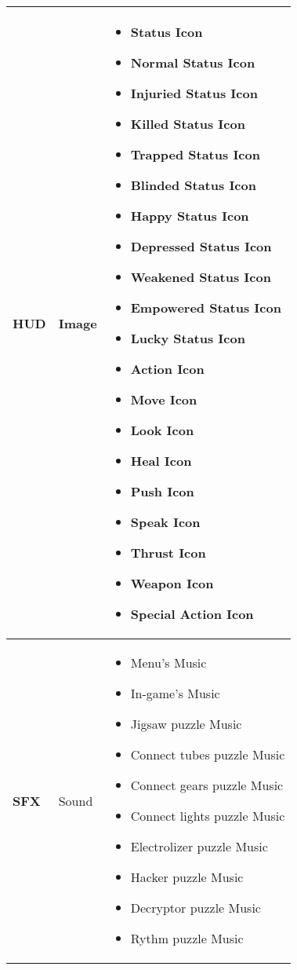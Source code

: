 \begin{tabular}{|m{3cm}|m{3cm}|m{7cm}|}
	\hline
    \textbf{HUD}& Image & 
    \begin{itemize}
    	\item Status Icon
    	\item Normal Status Icon
    	\item Injuried Status Icon
     	\item Killed Status Icon
     	\item Trapped Status Icon
     	\item Blinded Status Icon
     	\item Happy Status Icon
     	\item Depressed Status Icon
     	\item Weakened Status Icon
     	\item Empowered Status Icon
     	\item Lucky Status Icon
     	\item Action Icon
     	\item Move Icon
     	\item Look Icon
     	\item Heal Icon
     	\item Push Icon
     	\item Speak Icon
     	\item Thrust Icon
     	\item Weapon Icon
     	\item Special Action Icon
    \end{itemize}
	\\
	\hline
    \textbf{SFX}& Sound & 
    \begin{itemize}
     	\item Menu's Music
     	\item In-game's Music
		\item Jigsaw puzzle Music
		\item Connect tubes puzzle Music
		\item Connect gears puzzle Music
		\item Connect lights puzzle Music
		\item Electrolizer puzzle Music
		\item Hacker puzzle Music
		\item Decryptor puzzle Music
		\item Rythm puzzle Music
	\end{itemize}
	\\
	\hline
\end{tabular}
\pagebreak

